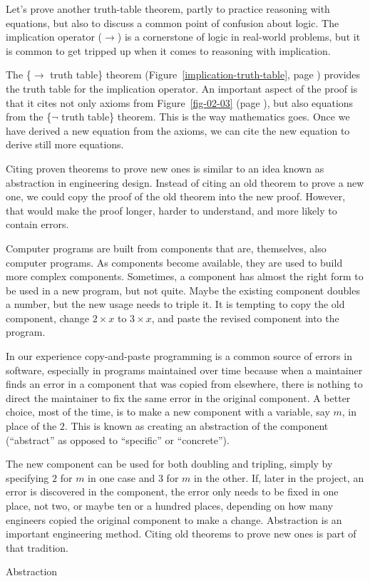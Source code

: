 Let's prove another truth-table theorem, partly to practice
reasoning with equations, but also to discuss a common
point of confusion about logic. The implication operator
($\rightarrow$) is a cornerstone of logic in real-world problems,
but it is common to get tripped up when it comes to
reasoning with implication.

The \{$\rightarrow$ truth table\} theorem
(Figure~\ref{implication-truth-table}, page \pageref{implication-truth-table})
provides the truth table
for the implication operator.
An important aspect of the proof is that it cites
not only axioms from Figure~\ref{fig-02-03} (page \pageref{fig-02-03}),
but also equations from the \{$\neg$ truth table\} theorem.
This is the way mathematics goes. Once we have derived
a new equation from the axioms, we can cite
the new equation to derive still more equations.

\begin{aside}
Citing proven theorems to prove new ones
is similar to an idea known as
abstraction
in engineering design.
Instead of citing an old theorem to prove a new one,
we could copy the proof of the old theorem into the new proof.
However, that would make the proof longer, harder to understand,
and more likely to contain errors.

Computer programs are built from components that are, themselves,
also computer programs. As components become available, 
they are used to build more complex components.
Sometimes, a component has almost the right form 
to be used in a new program, but not quite.
Maybe the existing component doubles a number, 
but the new usage needs to triple it. 
It is tempting to copy the
old component, change $2 \times x$ to $3 \times x$,
and paste the revised component into the program.

In our experience
copy-and-paste programming is
a common source of errors in software,
especially in programs maintained
over time because when a maintainer finds an error in
a component that was copied from elsewhere,
there is nothing to direct the maintainer to fix
the same error in the original component.
A better choice, most of the time,
is to make a new component with
a variable, say $m$, in place of the $2$.
This is known as creating an abstraction of the component
(``abstract'' as opposed to ``specific'' or ``concrete'').

The new component can be used for both doubling and tripling,
simply by specifying $2$ for $m$ in one case and $3$ for $m$ in the other.
If, later in the project, an error is discovered in the component,
the error only needs to be fixed in one place, not two,
or maybe ten or a hundred places, depending on how many engineers
copied the original component to make a change.
Abstraction is an important engineering method. 
Citing old theorems to prove new ones
is part of that tradition.
\caption{Abstraction}
\label{abstraction}
\end{aside}

